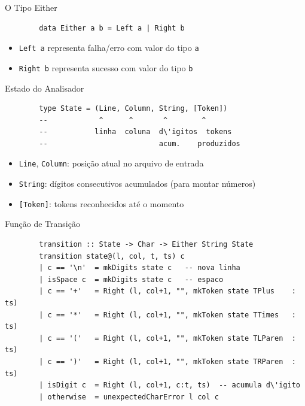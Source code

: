 \begin{frame}[fragile]{O Tipo Either}

    \begin{lstlisting}
        data Either a b = Left a | Right b
    \end{lstlisting}

    \begin{itemize}

        \item
        \texttt{Left a} representa falha/erro com valor do
        tipo \texttt{a}
        \item
        \texttt{Right b} representa sucesso com valor do tipo
        \texttt{b}
    \end{itemize}
\end{frame}

\begin{frame}[fragile]{Estado do Analisador}

    \begin{lstlisting}
        type State = (Line, Column, String, [Token])
        --            ^      ^       ^        ^
        --           linha  coluna  d\'igitos  tokens
        --                          acum.    produzidos
    \end{lstlisting}

    \begin{itemize}

        \item
        \texttt{Line}, \texttt{Column}:
        posição atual no arquivo de entrada
        \item
        \texttt{String}: dígitos consecutivos acumulados
        (para montar números)
        \item
        \texttt{[Token]}: tokens reconhecidos até o momento
    \end{itemize}
\end{frame}

\begin{frame}[fragile]{Função de Transição}

    \begin{lstlisting}
        transition :: State -> Char -> Either String State
        transition state@(l, col, t, ts) c
        | c == '\n'  = mkDigits state c   -- nova linha
        | isSpace c  = mkDigits state c   -- espaco
        | c == '+'   = Right (l, col+1, "", mkToken state TPlus    : ts)
        | c == '*'   = Right (l, col+1, "", mkToken state TTimes   : ts)
        | c == '('   = Right (l, col+1, "", mkToken state TLParen  : ts)
        | c == ')'   = Right (l, col+1, "", mkToken state TRParen  : ts)
        | isDigit c  = Right (l, col+1, c:t, ts)  -- acumula d\'igito
        | otherwise  = unexpectedCharError l col c
    \end{lstlisting}
\end{frame}

